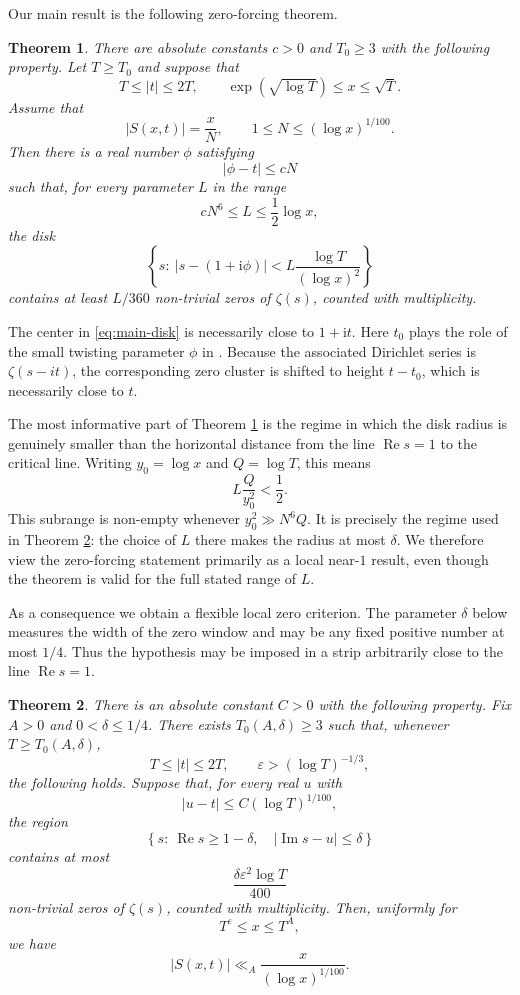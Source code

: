 \documentclass[12pt,reqno]{amsart}
\newtheorem{theorem}{Theorem}[section]
\theoremstyle{remark}
\numberwithin{equation}{section}
\newcommand{\Ree}{\operatorname{Re}}
\newcommand{\Imm}{\operatorname{Im}}
\newcommand{\ii}{\mathrm i}
\begin{document}
Our main result is the following zero-forcing theorem.

\begin{theorem}\label{thm:main}
There are absolute constants $c>0$ and $T_0\ge3$ with the following property.  Let $T\ge T_0$ and suppose that
\[
T\le |t|\le 2T,
\qquad
\exp(\sqrt{\log T})\le x\le \sqrt T.
\]
Assume that
\[
|S(x,t)|=\frac{x}{N},
\qquad
1\le N\le (\log x)^{1/100}.
\]
Then there is a real number $\phi$ satisfying
\[
|\phi-t|\le cN
\]
such that, for every parameter $L$ in the range
\[
cN^6\le L\le \frac12\log x,
\]
the disk
\begin{equation}\label{eq:main-disk}
\left\{s:\ |s-(1+\ii\phi)|<L\frac{\log T}{(\log x)^2}\right\}
\end{equation}
contains at least $L/360$ non-trivial zeros of $\zeta(s)$, counted with multiplicity.
\end{theorem}

The center in \eqref{eq:main-disk} is necessarily close to $1+\ii t$.  Here \(t_0\) plays the role of the small twisting parameter \(\phi\) in \cite[Theorem~1.3]{GS18}. Because the associated Dirichlet series is \(\zeta(s-it)\), the corresponding zero cluster is shifted to height \(t-t_0\), which is necessarily close to \(t\).

The most informative part of Theorem \ref{thm:main} is the regime in which the disk radius is genuinely smaller than the horizontal distance from the line $\Ree s=1$ to the critical line.  Writing $y_0=\log x$ and $Q=\log T$, this means
\[
L\frac{Q}{y_0^2}<\frac12.
\]
This subrange is non-empty whenever $y_0^2\gg N^6Q$.  It is precisely the regime used in Theorem \ref{thm:corollary}: the choice of $L$ there makes the radius at most $\delta$.  We therefore view the zero-forcing statement primarily as a local near-$1$ result, even though the theorem is valid for the full stated range of $L$.

As a consequence we obtain a flexible local zero criterion.  The parameter $\delta$ below measures the width of the zero window and may be any fixed positive number at most $1/4$.  Thus the hypothesis may be imposed in a strip arbitrarily close to the line $\Ree s=1$.

\begin{theorem}\label{thm:corollary}
There is an absolute constant $C>0$ with the following property.  Fix $A>0$ and $0<\delta\le1/4$.  There exists $T_0(A,\delta)\ge3$ such that, whenever $T\ge T_0(A,\delta)$,
\[
T\le |t|\le2T,
\qquad
\varepsilon>(\log T)^{-1/3},
\]
the following holds.  Suppose that, for every real $u$ with
\[
|u-t|\le C(\log T)^{1/100},
\]
the region
\begin{equation}\label{eq:zero-window}
\left\{s:\ \Ree s\ge1-\delta,\quad |\Imm s-u|\le\delta\right\}
\end{equation}
contains at most
\[
\frac{\delta\varepsilon^2\log T}{400}
\]
non-trivial zeros of $\zeta(s)$, counted with multiplicity.  Then, uniformly for
\[
T^\varepsilon\le x\le T^A,
\]
we have
\begin{equation}\label{eq:conditional-bound}
|S(x,t)|\ll_A \frac{x}{(\log x)^{1/100}}.
\end{equation}
\end{theorem}
\end{document}
